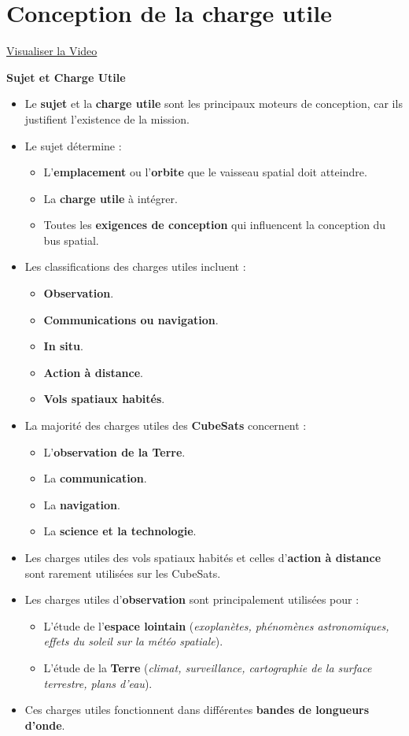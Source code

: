 \section{Conception de la charge utile}
\href{https://youtu.be/uHOsxEK5CUA}{Visualiser la Video}


\textbf{Sujet et Charge Utile}

\begin{itemize}
    \item Le \textbf{sujet} et la \textbf{charge utile} sont les principaux moteurs de conception, car ils justifient l'existence de la mission.
    \item Le sujet détermine :
    \begin{itemize}
        \item L'\textbf{emplacement} ou l'\textbf{orbite} que le vaisseau spatial doit atteindre.
        \item La \textbf{charge utile} à intégrer.
        \item Toutes les \textbf{exigences de conception} qui influencent la conception du bus spatial.
    \end{itemize}
    \item Les classifications des charges utiles incluent :
    \begin{itemize}
        \item \textbf{Observation}.
        \item \textbf{Communications ou navigation}.
        \item \textbf{In situ}.
        \item \textbf{Action à distance}.
        \item \textbf{Vols spatiaux habités}.
    \end{itemize}
    \item La majorité des charges utiles des \textbf{CubeSats} concernent :
    \begin{itemize}
        \item L'\textbf{observation de la Terre}.
        \item La \textbf{communication}.
        \item La \textbf{navigation}.
        \item La \textbf{science et la technologie}.
    \end{itemize}
    \item Les charges utiles des vols spatiaux habités et celles d'\textbf{action à distance} sont rarement utilisées sur les CubeSats.
    \item Les charges utiles d'\textbf{observation} sont principalement utilisées pour :
    \begin{itemize}
        \item L'étude de l'\textbf{espace lointain} (\textit{exoplanètes, phénomènes astronomiques, effets du soleil sur la météo spatiale}).
        \item L'étude de la \textbf{Terre} (\textit{climat, surveillance, cartographie de la surface terrestre, plans d'eau}).
    \end{itemize}
    \item Ces charges utiles fonctionnent dans différentes \textbf{bandes de longueurs d'onde}.
\end{itemize}

